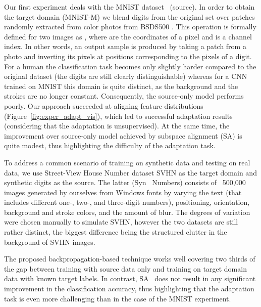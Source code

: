 \documentclass{article}
\newcommand{\fig}[1]{Figure~\ref{fig:#1}}
\begin{document}
\vspace{2mm}
Our first experiment deals with the MNIST dataset~\cite{LeCun98} (source). In order to obtain the target domain ({\sc MNIST-M}) we blend digits from the original set over patches randomly extracted from color photos from BSDS500 \cite{Arbelaez11}. This operation is formally defined for two images  as , where  are the coordinates of a pixel and  is a channel index. In other words, an output sample is produced by taking a patch from a photo and inverting its pixels at positions corresponding to the pixels of a digit. For a human the classification task becomes only slightly harder compared to the original dataset (the digits are still clearly distinguishable) whereas for a CNN trained on MNIST this domain is quite distinct, as the background and the strokes are no longer constant. Consequently, the source-only model performs poorly. Our approach succeeded at aligning feature distributions (\fig{exper_adapt_vis}), which led to successful adaptation results (considering that the adaptation is unsupervised). At the same time, the improvement over source-only model achieved by subspace alignment (SA) \cite{Fernando13} is quite modest, thus highlighting the difficulty of the adaptation task. 

\vspace{2mm}
To address a common scenario of training on synthetic data and testing on  real data, we use Street-View House Number dataset {\sc SVHN} \cite{Netzer11} as the target domain and synthetic digits as the source. The latter ({\sc Syn ~Numbers}) consists of ~500,000 images generated by ourselves from Windows fonts by varying the text (that includes different one-, two-, and three-digit numbers), positioning, orientation, background and stroke colors, and the amount of blur. The degrees of variation were chosen manually to simulate SVHN, however the two datasets are still rather distinct, the biggest difference being the structured clutter in the background of SVHN images. 

The proposed backpropagation-based technique works well covering two thirds of the gap between training with source data only and training on target domain data with known target labels. In contrast, SA~\cite{Fernando13} does not result in any significant improvement in the classification accuracy, thus highlighting that the adaptation task is even more challenging than in the case of the MNIST experiment.
\end{document}

